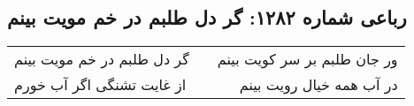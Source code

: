 \begin{center}
\section*{رباعی شماره ۱۲۸۲: گر دل طلبم در خم مویت بینم}
\label{sec:1282}
\begin{longtable}{l p{0.5cm} r}
گر دل طلبم در خم مویت بینم
&&
ور جان طلبم بر سر کویت بینم
\\
از غایت تشنگی اگر آب خورم
&&
در آب همه خیال رویت بینم
\\
\end{longtable}
\end{center}
